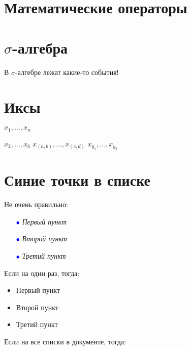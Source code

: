 \documentclass[12pt, a4paper]{article}
\theoremstyle{plain}              %
\theoremstyle{definition}         %
\begin{document}

\section{ Математические операторы } 



\section{$\sigma$-алгебра} 

\def \s{\ensuremath{\sigma}}

В \s-алгебре лежат какие-то события! 


\section{Иксы} 


\newcommand{\xvect}{\ensuremath{x_1,\ldots,x_n}}

\xvect

\newcommand{\xvec}[2]{\ensuremath{x_{#1},\ldots,x_{#2}}}

\xvec{2}{6} 
\xvec{(a,b)}{(c,d)}
\xvec{y_1}{y_2}

\section{Синие точки в списке} 

Не очень правильно: 

\begin{itemize}
\item [\textcolor{blue}{$\bullet$}]\textit{Первый пункт}
\item [\textcolor{blue}{$\bullet$}]\textit{Второй пункт}
\item [\textcolor{blue}{$\bullet$}]\textit{Третий пункт}
\end{itemize}

Если на один раз, тогда: 
\begin{itemize}[label=\LARGE\color{blue}{\textbullet} ]
\item Первый пункт
\item Второй пункт
\item Третий пункт
\end{itemize}


Если на все списки в документе, тогда: 
\end{document}
